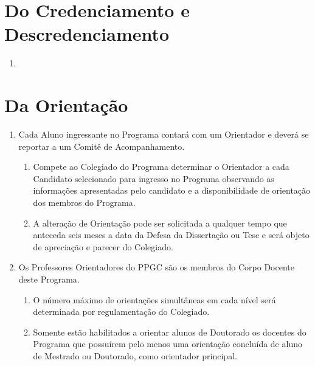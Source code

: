 \documentclass{article}
\begin{document}
\section{Do Credenciamento e Descredenciamento}
\begin{enumerate}
	\item 
\end{enumerate}


\section{Da Orientação}

\begin{enumerate}
	\item Cada Aluno ingressante no Programa contará com um Orientador e deverá se reportar a um Comitê de Acompanhamento.
	\begin{enumerate}
		\item Compete ao Colegiado do Programa determinar o Orientador a cada Candidato selecionado para ingresso no Programa observando as informações apresentadas pelo candidato e a disponibilidade de orientação dos membros do Programa.
		\item A alteração de Orientação pode ser solicitada a qualquer tempo que anteceda seis meses a data da Defesa da Dissertação ou Tese e será objeto de apreciação e parecer do Colegiado.
	\end{enumerate}

	\item Os Professores Orientadores do PPGC são os membros do Corpo Docente deste Programa. 
	\begin{enumerate}
		\item O número máximo de orientações simultâneas em cada nível será determinada por regulamentação do Colegiado.
		\item Somente estão habilitados a orientar alunos de Doutorado os docentes do Programa que possuírem pelo menos uma orientação concluída de aluno de Mestrado ou Doutorado, como orientador principal.
	\end{enumerate}


\end{enumerate}
\end{document}
